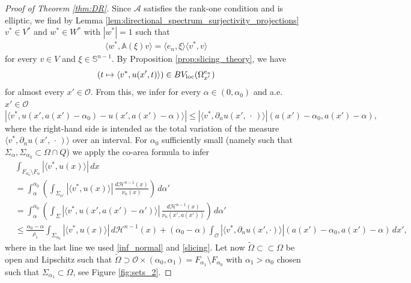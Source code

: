 \documentclass[11pt,reqno]{amsart}
\theoremstyle{plain}
\theoremstyle{definition}
\theoremstyle{remark}
\numberwithin{equation}{section}
\newcommand{\s}{\mathbb{S}}
\renewcommand{\H}{\mathcal{H}}
\newcommand{\A}{\mathcal{A}}
\renewcommand{\AA}{\mathbb{A}}
\newcommand{\1}{\mathbbm{1}} %
\begin{document}
\begin{proof}[Proof of Theorem \ref{thm:DR}]
    Since $\A$ satisfies the rank-one condition and is elliptic, we find by Lemma \ref{lem:directional_spectrum_surjectivity_projections} $v^* \in V^*$ and $w^* \in W^*$ with $|w^*| = 1$ such that 
    \begin{align}
        \langle w^* , \AA(\xi) v \rangle  = \langle e_n , \xi \rangle \langle v^* , v \rangle
    \end{align}
    for every $v \in V$ and $\xi \in \s^{n-1}$. By Proposition \ref{prop:slicing_theory}, we have 
    \[
        (t \mapsto \langle v^*, u(x', t)\rangle)  \in BV_{\rm loc}(\Omega^{e_n}_{x'})
    \]
    for almost every $x' \in \mathcal O$. From this, we infer for every $\alpha \in (0, \alpha_0)$ and a.e. $x' \in \mathcal{O}$ 
    \begin{equation}
    \label{slicing}
        |\langle v^*, u(x',a(x')-\alpha_0) - u(x',a(x')-\alpha) \rangle| \le |\langle v^*, \partial_n u(x',\,\cdot\,) \rangle|(a(x')-\alpha_0, a(x')-\alpha),
    \end{equation}
    where the right-hand side is intended as the total variation of the measure $\langle v^*,  \partial_n u(x', \,\cdot\, ) \rangle$ over an interval. For $\alpha_0$ sufficiently small (namely such that $\Sigma_\alpha, \Sigma_{\alpha_0} \subset \Omega \cap Q$) we apply the co-area formula to infer
    \begin{equation*}
    \begin{aligned}
        &\int_{F_{\alpha_0} \setminus F_\alpha} | \langle v^*,  u(x) \rangle| \, dx \\
        &= \int_\alpha^{\alpha_0} \left( \int_{\Sigma_{\alpha'}} |\langle v^*,  u(x) \rangle| \, \frac{d\H^{n-1}(x)}{\nu_n(x)} \right) \, d\alpha' \\
        &= \int_\alpha^{\alpha_0} \left( \int_\Sigma | \langle v^*, u(x',a(x') - \alpha') \rangle| \, \frac{d\H^{n-1}(x)}{\nu_n(x',a(x'))} \right) \, d\alpha' \\
        &\le \frac{\alpha_0 - \alpha}{\rho_1} \int_{\Sigma_{\alpha_0}} |\langle v^*,  u(x) \rangle| \, d\H^{n-1}(x) + (\alpha_0 - \alpha) \int_\mathcal{O} |\langle v^*, \partial_n u(x',\cdot) \rangle|(a(x')-\alpha_0, a(x')-\alpha) \, dx',
    \end{aligned}
    \end{equation*}
    where in the last line we used \eqref{inf_normal} and \eqref{slicing}. Let now $\widetilde{\Omega} \subset\subset \Omega$ be open and Lipschitz such that $\widetilde{\Omega} \supset \mathcal{O} \times (\alpha_0,\alpha_1) = F_{\alpha_1} \setminus F_{\alpha_0}$ with $\alpha_1 > \alpha_0$ chosen such that $\Sigma_{\alpha_1} \subset \Omega$, see Figure \ref{fig:sets_2}.


\end{proof}
\end{document}
